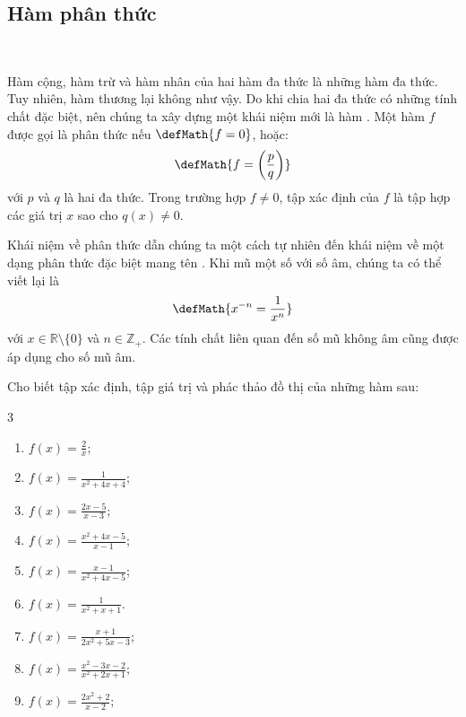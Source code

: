 \subsection{Hàm phân thức}

\ %

Hàm cộng, hàm trừ và hàm nhân của hai hàm đa thức là những hàm đa thức. Tuy nhiên, hàm thương lại không như vậy. Do khi chia hai đa thức có những tính chất đặc biệt, nên chúng ta xây dựng một khái niệm mới là hàm . Một hàm $f$ được gọi là phân thức nếu $\defMath{f = 0}$, hoặc: $$\defMath{f = \left(\frac{p}{q}\right)}$$ với $p$ và $q$ là hai đa thức. Trong trường hợp $f \neq 0$, tập xác định của $f$ là tập hợp các giá trị $x$ sao cho $q(x) \neq 0$. 

Khái niệm về phân thức dẫn chúng ta một cách tự nhiên đến khái niệm về một dạng phân thức đặc biệt mang tên . Khi mũ một số với số âm, chúng ta có thể viết lại là $$\defMath{x^{-n} = \frac{1}{x^n}}$$ với $x \in \mathbb{R} \setminus \{0\}$ và $n \in \mathbb{Z}_+$. Các tính chất liên quan đến số mũ không âm cũng được áp dụng cho số mũ âm.

\exercise Cho biết tập xác định, tập giá trị và phác thảo đồ thị của những hàm sau:
\begin{multicols}{3}
   \begin{enumerate}
      \item $\displaystyle f(x) = \frac{2}{x}$;
      \item $\displaystyle f(x) = \frac{1}{x^2 + 4x + 4}$;
      \item $\displaystyle f(x) = \frac{2x - 5}{x - 3}$;
      \item $\displaystyle f(x) = \frac{x^2 + 4x - 5}{x - 1}$;
      \item $\displaystyle f(x) = \frac{x - 1}{x^2 + 4x - 5}$;
      \item $\displaystyle f(x) = \frac{1}{x^2 + x + 1}$.
      \item $\displaystyle f(x) = \frac{x + 1}{2x^2 + 5x - 3}$;
      \item $\displaystyle f(x) = \frac{x^2 - 3x - 2}{x^2 + 2x + 1}$;
      \item $\displaystyle f(x) = \frac{2x^2 + 2}{x - 2}$;
   \end{enumerate}
\end{multicols}

\solution

